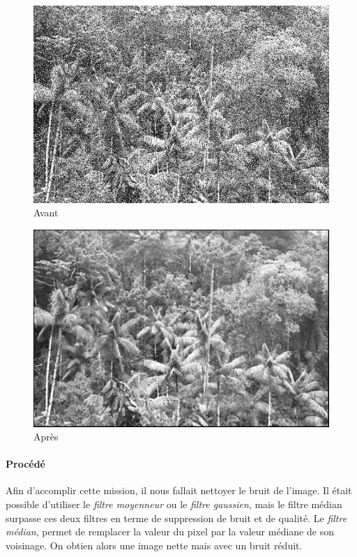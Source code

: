 	\begin{figure}[h]
	\centering
		\begin{multicols}{2}
		\includegraphics[scale=0.45]{images/Gliese_581d-V2.png}
		Avant

		\includegraphics[scale=0.45]{images/MissionX2v2.png}
		Après
		\end{multicols}
	\end{figure}
	\vspace{-0.9cm}

	\paragraph{Procédé}
	
		Afin d'accomplir cette mission, il nous fallait nettoyer le bruit de l'image. Il était possible d'utiliser le \emph{filtre moyenneur} ou le \emph{filtre gaussien}, mais le filtre médian surpasse ces deux filtres en terme de suppression de bruit et de qualité. Le \emph{filtre médian}, permet de remplacer la valeur du pixel par la valeur médiane de son voisinage. On obtien alors une image nette mais avec un bruit réduit.